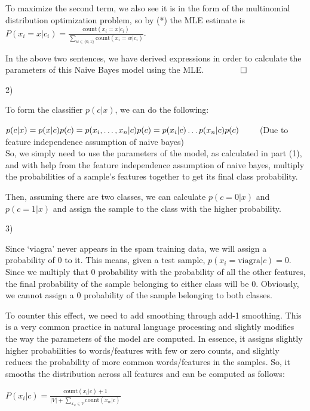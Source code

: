 To maximize the second term, we also see it is in the form of the multinomial distribution optimization problem, so by (*) the MLE estimate is $P(x_i = x \vert c_i) = \frac{\text{count}(x_i = x \vert c_i)}{\sum_{w \in \{0, 1\}} \text{count}(x_i = w \vert c_i)}$.

In the above two sentences, we have derived expressions in order to calculate the parameters of this Naive Bayes model using the MLE. $\qquad \qed$

2) 

To form the classifier $p(c \vert x)$, we can do the following:

$p(c \vert x) \\
= p(x \vert c)p(c) \\
= p(x_i, \dots, x_n \vert c)p(c) \\
= p(x_i \vert c)\dots p(x_n \vert c)p(c) \qquad$ (Due to feature independence assumption of naive bayes) \\

So, we simply need to use the parameters of the model, as calculated in part (1), and with help from the feature independence assumption of naive bayes, multiply the probabilities of a sample's features together to get its final class probability.

Then, assuming there are two classes, we can calculate $p(c = 0 \vert x)$ and $p(c = 1 \vert x)$ and assign the sample to the class with the higher probability.

3)

Since `viagra' never appears in the spam training data, we will assign a probability of 0 to it. This means, given a test sample, $p(x_i = \text{viagra} \vert c) = 0$. Since we multiply that 0 probability with the probability of all the other features, the final probability of the sample belonging to either class will be 0. Obviously, we cannot assign a 0 probability of the sample belonging to both classes.

To counter this effect, we need to add smoothing through add-1 smoothing. This is a very common practice in natural language processing and slightly modifies the way the parameters of the model are computed. In essence, it assigns slightly higher probabilities to words/features with few or zero counts, and slightly reduces the probability of more common words/features in the samples. So, it smooths the distribution across all features and can be computed as follows:

$P(x_i \vert c) = \frac{\text{count}(x_i \vert c) + 1}{\vert V \vert + \sum_{x_w \in V} \text{count}(x_w \vert c)}$

